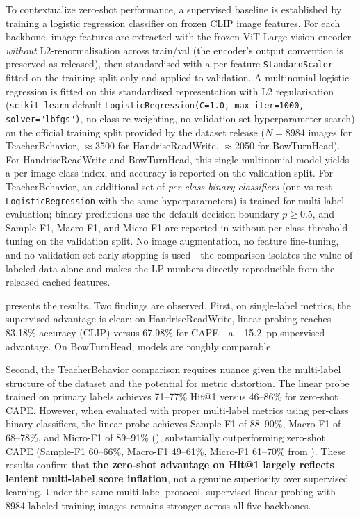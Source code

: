 \documentclass[symmetry,article,submit,pdftex,moreauthors]{Definitions/mdpi}
\begin{document}
To contextualize zero-shot performance, a supervised baseline is established by training a logistic regression classifier on frozen CLIP image features. For each backbone, image features are extracted with the frozen ViT-Large vision encoder \emph{without} L2-renormalisation across train/val (the encoder's output convention is preserved as released), then standardised with a per-feature \texttt{StandardScaler} fitted on the training split only and applied to validation. A multinomial logistic regression is fitted on this standardised representation with L2 regularisation (\texttt{scikit-learn} default \texttt{LogisticRegression(C=1.0, max\_iter=1000, solver="lbfgs")}, no class re-weighting, no validation-set hyperparameter search) on the official training split provided by the dataset release ($N=8984$ images for TeacherBehavior, $\approx$3500 for HandriseReadWrite, $\approx$2050 for BowTurnHead). For HandriseReadWrite and BowTurnHead, this single multinomial model yields a per-image class index, and accuracy is reported on the validation split. For TeacherBehavior, an additional set of \emph{per-class binary classifiers} (one-vs-rest \texttt{LogisticRegression} with the same hyperparameters) is trained for multi-label evaluation; binary predictions use the default decision boundary $p\geq0.5$, and Sample-F1, Macro-F1, and Micro-F1 are reported in  without per-class threshold tuning on the validation split. No image augmentation, no feature fine-tuning, and no validation-set early stopping is used---the comparison isolates the value of labeled data alone and makes the LP numbers directly reproducible from the released cached features.

 presents the results. Two findings are observed. First, on single-label metrics, the supervised advantage is clear: on HandriseReadWrite, linear probing reaches 83.18\% accuracy (CLIP) versus 67.98\% for CAPE---a +15.2~pp supervised advantage. On BowTurnHead, models are roughly comparable.

Second, the TeacherBehavior comparison requires nuance given the multi-label structure of the dataset and the potential for metric distortion. The linear probe trained on primary labels achieves 71--77\% Hit@1 versus 46--86\% for zero-shot CAPE. However, when evaluated with proper multi-label metrics using per-class binary classifiers, the linear probe achieves Sample-F1 of 88--90\%, Macro-F1 of 68--78\%, and Micro-F1 of 89--91\% (), substantially outperforming zero-shot CAPE (Sample-F1 60--66\%, Macro-F1 49--61\%, Micro-F1 61--70\% from ). These results confirm that \textbf{the zero-shot advantage on Hit@1 largely reflects lenient multi-label score inflation}, not a genuine superiority over supervised learning. Under the same multi-label protocol, supervised linear probing with 8984 labeled training images remains stronger across all five backbones.
\end{document}
